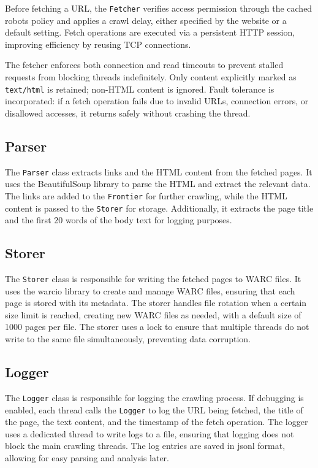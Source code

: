 \documentclass[sigconf]{acmart}
\begin{document}
Before fetching a URL, the \texttt{Fetcher} verifies access permission through the cached robots policy and applies a crawl delay, either specified by the website or a default setting. Fetch operations are executed via a persistent HTTP session, improving efficiency by reusing TCP connections.

The fetcher enforces both connection and read timeouts to prevent stalled requests from blocking threads indefinitely. Only content explicitly marked as \texttt{text/html} is retained; non-HTML content is ignored. Fault tolerance is incorporated: if a fetch operation fails due to invalid URLs, connection errors, or disallowed accesses, it returns safely without crashing the thread.

\subsection{Parser}
The \texttt{Parser} class extracts links and the HTML content from the fetched pages. It uses the BeautifulSoup library to parse the HTML and extract the relevant data. The links are added to the \texttt{Frontier} for further crawling, while the HTML content is passed to the \texttt{Storer} for storage. Additionally, it extracts the page title and the first 20 words of the body text for logging purposes.

\subsection{Storer}
The \texttt{Storer} class is responsible for writing the fetched pages to WARC files. It uses the warcio library to create and manage WARC files, ensuring that each page is stored with its metadata. The storer handles file rotation when a certain size limit is reached, creating new WARC files as needed, with a default size of 1000 pages per file. The storer uses a lock to ensure that multiple threads do not write to the same file simultaneously, preventing data corruption.

\subsection{Logger}
The \texttt{Logger} class is responsible for logging the crawling process. If debugging is enabled, each thread calls the \texttt{Logger} to log the URL being fetched, the title of the page, the text content, and the timestamp of the fetch operation. The logger uses a dedicated thread to write logs to a file, ensuring that logging does not block the main crawling threads. The log entries are saved in jsonl format, allowing for easy parsing and analysis later.
\end{document}
